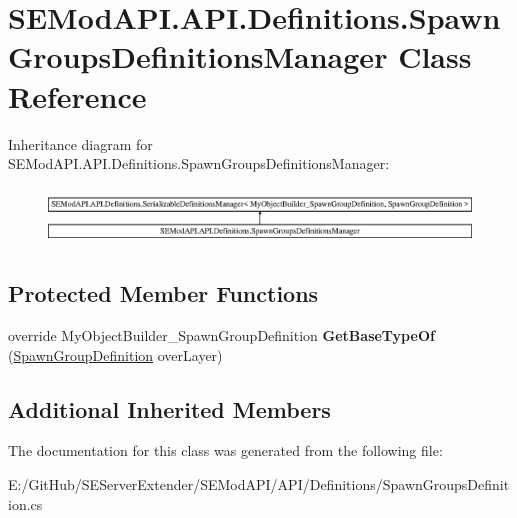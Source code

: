 \hypertarget{class_s_e_mod_a_p_i_1_1_a_p_i_1_1_definitions_1_1_spawn_groups_definitions_manager}{}\section{S\+E\+Mod\+A\+P\+I.\+A\+P\+I.\+Definitions.\+Spawn\+Groups\+Definitions\+Manager Class Reference}
\label{class_s_e_mod_a_p_i_1_1_a_p_i_1_1_definitions_1_1_spawn_groups_definitions_manager}
Inheritance diagram for S\+E\+Mod\+A\+P\+I.\+A\+P\+I.\+Definitions.\+Spawn\+Groups\+Definitions\+Manager\+:\begin{figure}[H]
\begin{center}
\leavevmode
\includegraphics[height=1.523810cm]{class_s_e_mod_a_p_i_1_1_a_p_i_1_1_definitions_1_1_spawn_groups_definitions_manager}
\end{center}
\end{figure}
\subsection*{Protected Member Functions}
\begin{DoxyCompactItemize}
\item 
\hypertarget{class_s_e_mod_a_p_i_1_1_a_p_i_1_1_definitions_1_1_spawn_groups_definitions_manager_abfba85c64129c722013abf63c174a64d}{}override My\+Object\+Builder\+\_\+\+Spawn\+Group\+Definition {\bfseries Get\+Base\+Type\+Of} (\hyperlink{class_s_e_mod_a_p_i_1_1_a_p_i_1_1_definitions_1_1_spawn_group_definition}{Spawn\+Group\+Definition} over\+Layer)\label{class_s_e_mod_a_p_i_1_1_a_p_i_1_1_definitions_1_1_spawn_groups_definitions_manager_abfba85c64129c722013abf63c174a64d}

\end{DoxyCompactItemize}
\subsection*{Additional Inherited Members}


The documentation for this class was generated from the following file\+:\begin{DoxyCompactItemize}
\item 
E\+:/\+Git\+Hub/\+S\+E\+Server\+Extender/\+S\+E\+Mod\+A\+P\+I/\+A\+P\+I/\+Definitions/Spawn\+Groups\+Definition.\+cs\end{DoxyCompactItemize}
